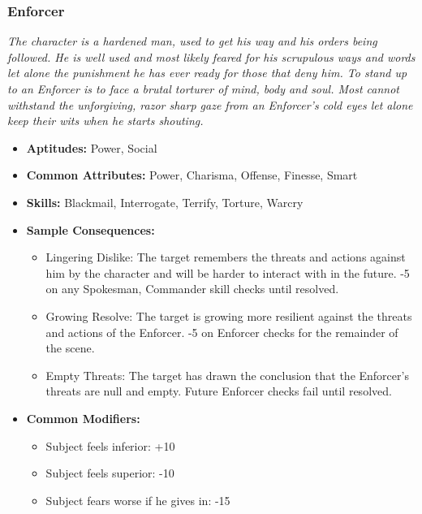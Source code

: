 \subsubsection{Enforcer}\label{Enforcer}
\textit{The character is a hardened man, used to get his way and his orders being followed. 
He is well used and most likely feared for his scrupulous ways and words let alone the punishment he has ever ready for those that deny him.
To stand up to an Enforcer is to face a brutal torturer of mind, body and soul. 
Most cannot withstand the unforgiving, razor sharp gaze from an Enforcer's cold eyes let alone keep their wits when he starts shouting.}
\begin{itemize}
	\item \textbf{Aptitudes:} Power, Social
	\item \textbf{Common Attributes:} Power, Charisma, Offense, Finesse, Smart
	\item \textbf{Skills:} Blackmail, Interrogate, Terrify, Torture, Warcry
	\item \textbf{Sample Consequences:} 
	\begin{itemize}
		\item Lingering Dislike: The target remembers the threats and actions against him by the character and will be harder to interact with in the future. -5 on any Spokesman, Commander skill checks until resolved.
		\item Growing Resolve: The target is  growing more resilient against the threats and actions of the Enforcer. -5 on Enforcer checks for the remainder of the scene.
		\item Empty Threats: The target has drawn the conclusion that the Enforcer's threats are null and empty. Future Enforcer checks fail until resolved.
	\end{itemize}
	\item \textbf{Common Modifiers:}
	\begin{itemize}
		\item Subject feels inferior: +10
		\item Subject feels superior: -10
		\item Subject fears worse if he gives in: -15 
	\end{itemize}
\end{itemize}

